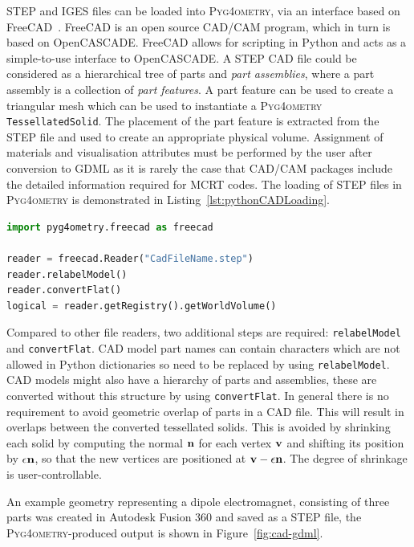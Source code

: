 \documentclass[preprint,12pt]{elsarticle}
\newcommand{\pyinline}[1]{\lstinline[postbreak={}]{#1}}
\newcommand{\PYGEOMETRY}{\textsc{Pyg4ometry}}
\begin{document}
STEP and IGES files can be loaded into \PYGEOMETRY{}, via an interface
based on FreeCAD~\cite{FreeCAD}. FreeCAD is an open source CAD/CAM program,
which in turn is based on OpenCASCADE. FreeCAD allows for scripting in
Python and acts as a simple-to-use interface to OpenCASCADE.  A STEP CAD
file could be considered as a hierarchical tree of parts and \emph{part
  assemblies}, where a part assembly is a collection of \emph{part
  features}. A part feature can be used to create a triangular mesh which
can be used to instantiate a \PYGEOMETRY{} \pyinline{TessellatedSolid}. The
placement of the part feature is extracted from the STEP file and used to
create an appropriate physical volume. Assignment of materials and
visualisation attributes must be performed by the user after conversion to
GDML as it is rarely the case that CAD/CAM packages include the detailed
information required for MCRT codes. The loading of STEP files in
\PYGEOMETRY{} is demonstrated in Listing~\ref{lst:pythonCADLoading}.

\begin{lstlisting}[caption={A simple \PYGEOMETRY{} Python script to load a STEP file.},label={lst:pythonCADLoading}, language=Python]
import pyg4ometry.freecad as freecad

reader = freecad.Reader("CadFileName.step")
reader.relabelModel()
reader.convertFlat()
logical = reader.getRegistry().getWorldVolume()
\end{lstlisting}
Compared to other file readers, two additional steps are required: \pyinline{relabelModel} and \pyinline{convertFlat}. CAD model
part names can contain characters which are not allowed in Python
dictionaries so need to be replaced by using \pyinline{relabelModel}.
CAD models might also have a hierarchy of parts and assemblies, these are
converted without this structure by using \pyinline{convertFlat}.
In general there is no requirement to avoid geometric overlap  of parts in
a CAD file. This will result in overlaps between the converted tessellated
solids. This is avoided by shrinking each solid by computing the normal ${\bf n}$  for each
vertex ${\bf v}$ and shifting its position by $\epsilon {\bf n}$, so that
the new vertices are positioned at ${\bf v} - \epsilon {\bf n}$. The degree of shrinkage
is user-controllable.

An example geometry representing a dipole electromagnet, consisting of three parts was created in Autodesk Fusion 360
and saved as a STEP file, the \PYGEOMETRY{}-produced output is shown in Figure~\ref{fig:cad-gdml}.
\end{document}
